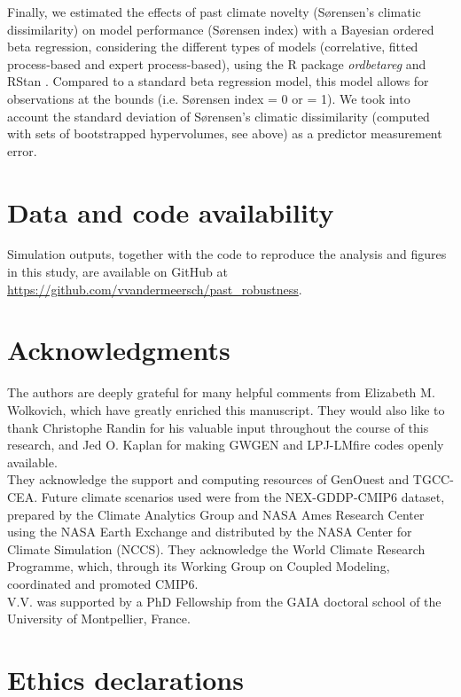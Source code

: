 \documentclass[pdflatex, sn-nature]{sn-jnl}%
\begin{document}
Finally, we estimated the effects of past climate novelty (Sørensen's climatic dissimilarity) on model performance (Sørensen index) with a Bayesian ordered beta regression, considering the different types of models (correlative, fitted process-based and expert process-based), using the R package \emph{ordbetareg} \cite{Kubinec2023} and RStan \cite{SDT2023}. Compared to a  standard beta regression model, this model allows for observations at the bounds (i.e. Sørensen index = 0 or = 1). We took into account the standard deviation of Sørensen's climatic dissimilarity (computed with sets of bootstrapped hypervolumes, see above) as a predictor measurement error.

\backmatter

\section*{Data and code availability}

Simulation outputs, together with the code to reproduce the analysis and figures in this study, are available on GitHub at \url{https://github.com/vvandermeersch/past_robustness}.

\section*{Acknowledgments}

The authors are deeply grateful for many helpful comments from Elizabeth M. Wolkovich, which have greatly enriched this manuscript. They would also like to thank Christophe Randin for his valuable input throughout the course of this research, and Jed O. Kaplan for making GWGEN and LPJ-LMfire codes openly available.\\
They acknowledge the support and computing resources of GenOuest and TGCC-CEA.
Future climate scenarios used were from the NEX-GDDP-CMIP6 dataset, prepared by the Climate Analytics Group and NASA Ames Research Center using the NASA Earth Exchange and distributed by the NASA Center for Climate Simulation (NCCS). They acknowledge the World Climate Research Programme, which, through its Working Group on Coupled Modeling, coordinated and promoted CMIP6.\\
V.V. was supported by a PhD Fellowship from the GAIA doctoral school of the University of Montpellier, France.

\section*{Ethics declarations}
\end{document}
